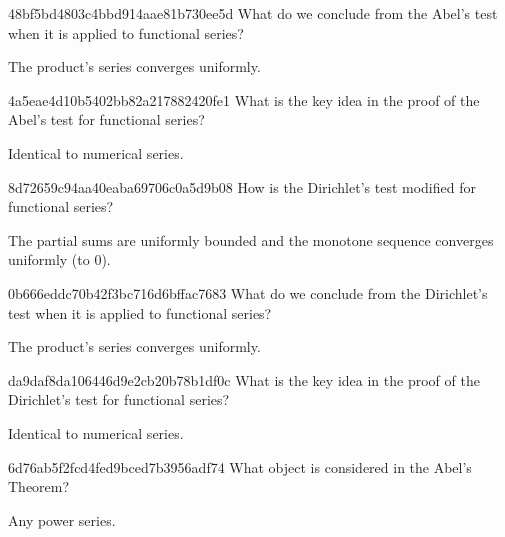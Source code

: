 \begin{note}{48bf5bd4803c4bbd914aae81b730ee5d}
    What do we conclude from the Abel's test when it is applied to functional series?

    \begin{cloze}{1}
        The product's series converges uniformly.
    \end{cloze}
\end{note}

\begin{note}{4a5eae4d10b5402bb82a217882420fe1}
    What is the key idea in the proof of the Abel's test for functional series?

    \begin{cloze}{1}
        Identical to numerical series.
    \end{cloze}
\end{note}

\begin{note}{8d72659c94aa40eaba69706c0a5d9b08}
   How is the Dirichlet's test modified for functional series?

   \begin{cloze}{1}
        The partial sums are uniformly bounded and the monotone sequence converges uniformly (to \({ 0 }\)).
   \end{cloze}
\end{note}

\begin{note}{0b666eddc70b42f3bc716d6bffac7683}
    What do we conclude from the Dirichlet's test when it is applied to functional series?

    \begin{cloze}{1}
        The product's series converges uniformly.
    \end{cloze}
\end{note}

\begin{note}{da9daf8da106446d9e2cb20b78b1df0c}
    What is the key idea in the proof of the Dirichlet's test for functional series?

    \begin{cloze}{1}
        Identical to numerical series.
    \end{cloze}
\end{note}

\begin{note}{6d76ab5f2fcd4fed9bced7b3956adf74}
    What object is considered in the Abel's Theorem?

    \begin{cloze}{1}
        Any power series.
    \end{cloze}
\end{note}

